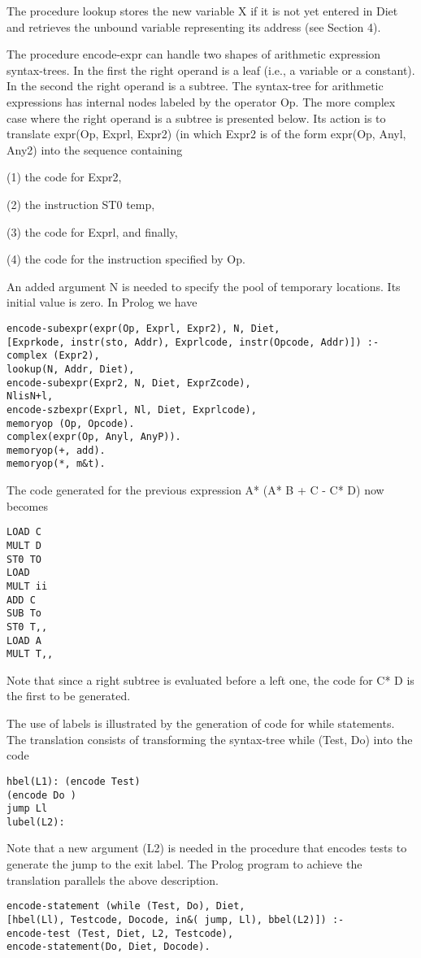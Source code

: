 The procedure lookup stores the new variable X if it is not yet entered in Diet
and retrieves the unbound variable representing its address (see Section 4). 

The procedure encode-expr can handle two shapes of arithmetic expression
syntax-trees. In the first the right operand is a leaf (i.e., a variable or a constant).
In the second the right operand is a subtree. The syntax-tree for arithmetic
expressions has internal nodes labeled by the operator Op. The more complex
case where the right operand is a subtree is presented below. Its action is to
translate expr(Op, Exprl, Expr2) (in which Expr2 is of the form expr(Op, Anyl,
Any2) into the sequence containing

(1) the code for Expr2,

(2) the instruction ST0 temp,

(3) the code for Exprl, and finally,

(4) the code for the instruction specified by Op. 

An added argument N is needed to specify the pool of temporary locations. Its
initial value is zero. In Prolog we have
\begin{verbatim}
encode-subexpr(expr(Op, Exprl, Expr2), N, Diet,
[Exprkode, instr(sto, Addr), Exprlcode, instr(Opcode, Addr)]) :-
complex (Expr2),
lookup(N, Addr, Diet),
encode-subexpr(Expr2, N, Diet, ExprZcode),
NlisN+l,
encode-szbexpr(Exprl, Nl, Diet, Exprlcode),
memoryop (Op, Opcode).
complex(expr(Op, Anyl, AnyP)).
memoryop(+, add).
memoryop(*, m&t).
\end{verbatim}

The code generated for the previous expression A* (A* B + C - C* D) now
becomes
\begin{verbatim}
LOAD C
MULT D
ST0 TO
LOAD
MULT ii
ADD C
SUB To
ST0 T,,
LOAD A
MULT T,, 
\end{verbatim}
Note that since a right subtree is evaluated before a left one, the code for C* D
is the first to be generated. 

The use of labels is illustrated by the generation of code for while statements.
The translation consists of transforming the syntax-tree while (Test, Do) into the
code
\begin{verbatim}
hbel(L1): (encode Test)
(encode Do )
jump Ll
lubel(L2): 
\end{verbatim}

Note that a new argument (L2) is needed in the procedure that encodes tests
to generate the jump to the exit label. The Prolog program to achieve the
translation parallels the above description.
\begin{verbatim}
encode-statement (while (Test, Do), Diet,
[hbel(Ll), Testcode, Docode, in&( jump, Ll), bbel(L2)]) :-
encode-test (Test, Diet, L2, Testcode),
encode-statement(Do, Diet, Docode). 
\end{verbatim}


  
\secup